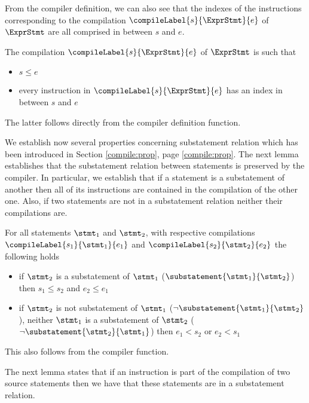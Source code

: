 From the compiler definition, we can also see that the indexes of the instructions corresponding to the compilation 
$\compileLabel{s}{\ExprStmt}{e}$  of $ \ExprStmt$  are all comprised in between $s$ and $e$.  
\begin{compPropApp}\label{compile:prop:compPropIndex}
The compilation $\compileLabel{s}{\ExprStmt}{e}$ 
of $ \ExprStmt$ is such that 

\begin{itemize}
 \item $s \le e$
 \item every instruction in $\compileLabel{s}{\ExprStmt}{e}$  has an index  in between $s$ and $e$
\end{itemize}
\end{compPropApp}
The latter follows directly from the compiler definition function.
 

We establish now several properties concerning substatement relation which has been introduced in Section \ref{compile:prop}, page \ref{compile:prop}.
The next lemma establishes that the substatement relation between statements is preserved by the compiler. 
In particular, we establish that if a statement is a substatement of another then all of its instructions are contained in 
the compilation of the other one. Also, if two statements are not in a substatement relation neither their compilations are.
\begin{compPropApp}\label{compile:prop:compProp6}
   For all statements $\stmt_1$ and $\stmt_2$, with respective compilations 
   $\compileLabel{s_1}{\stmt_1}{e_1}$ and  $\compileLabel{s_2}{\stmt_2}{e_2}$ the following holds
   \begin{itemize} 
         \item if $\stmt_2$ is a substatement of  $\stmt_1$ ($\substatement{\stmt_1}{\stmt_2}$) then 
	     $s_1 \le s_2$ and $ e_2 \le e_1$
	  \item if  $\stmt_2$ is not  substatement of  $\stmt_1$ ($\neg \substatement{\stmt_1}{\stmt_2}$), neither $\stmt_1$ is a substatement of  $\stmt_2$ 
                ($\neg \substatement{\stmt_2}{\stmt_1}$) then
	     $e_1 < s_2  $ or $ e_2 < s_1$
   \end{itemize}
\end{compPropApp}
This also follows from the compiler function.


The next lemma states that if an instruction is part of the compilation 
of two source statements then we have that these statements are in a substatement relation. 

